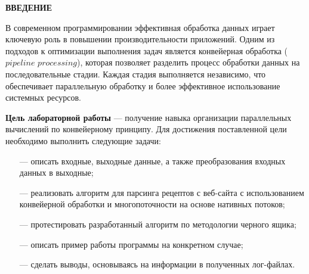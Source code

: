 \begin{center}
    \textbf{ВВЕДЕНИЕ}
\end{center}

В современном программировании эффективная обработка данных играет ключевую роль в повышении производительности приложений. Одним из подходов к оптимизации выполнения задач является конвейерная обработка ($pipeline$ $processing$), которая позволяет разделить процесс обработки данных на последовательные стадии. Каждая стадия выполняется независимо, что обеспечивает параллельную обработку и более эффективное использование системных ресурсов.

\textbf{Цель лабораторной работы} --- получение навыка организации параллельных вычислений по конвейерному принципу. Для достижения поставленной цели необходимо выполнить следующие задачи:

\begin{itemize}
	\item[---] описать входные, выходные данные, а также преобразования входных данных в выходные;
	\item[---] реализовать алгоритм для парсинга рецептов с веб-сайта с использованием конвейерной обработки и многопоточности на основе нативных потоков;
	\item[---] протестировать разработанный алгоритм по методологии черного ящика;
    \item[---] описать пример работы программы на конкретном случае;
    \item[---] сделать выводы, основываясь на информации в полученных лог-файлах.
\end{itemize}